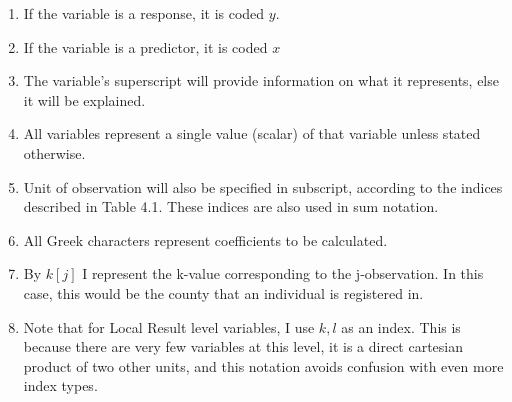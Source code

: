 \documentclass[12pt,twoside]{reedthesis}
\providecommand{\tightlist}{%
  \setlength{\itemsep}{0pt}\setlength{\parskip}{0pt}}
\begin{document}
  \begin{enumerate}
  \def\labelenumi{\arabic{enumi}.}
  \tightlist
  \item
    If the variable is a response, it is coded \(y\).
  \item
    If the variable is a predictor, it is coded \(x\)
  \item
    The variable's superscript will provide information on what it
    represents, else it will be explained.
  \item
    All variables represent a single value (scalar) of that variable
    unless stated otherwise.
  \item
    Unit of observation will also be specified in subscript, according to
    the indices described in Table 4.1. These indices are also used in sum
    notation.
  \item
    All Greek characters represent coefficients to be calculated.
  \item
    By \(k[j]\) I represent the k-value corresponding to the
    j-observation. In this case, this would be the county that an
    individual is registered in.
  \item
    Note that for Local Result level variables, I use \(k,l\) as an index.
    This is because there are very few variables at this level, it is a
    direct cartesian product of two other units, and this notation avoids
    confusion with even more index types.
  \end{enumerate}
  
\end{document}
